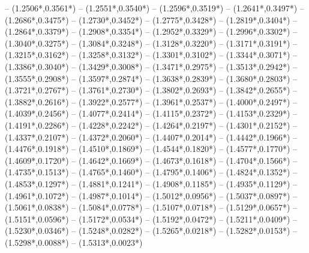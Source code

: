 {	-- ({1.2506*\dx},{0.3561*\dy})
	-- ({1.2551*\dx},{0.3540*\dy})
	-- ({1.2596*\dx},{0.3519*\dy})
	-- ({1.2641*\dx},{0.3497*\dy})
	-- ({1.2686*\dx},{0.3475*\dy})
	-- ({1.2730*\dx},{0.3452*\dy})
	-- ({1.2775*\dx},{0.3428*\dy})
	-- ({1.2819*\dx},{0.3404*\dy})
	-- ({1.2864*\dx},{0.3379*\dy})
	-- ({1.2908*\dx},{0.3354*\dy})
	-- ({1.2952*\dx},{0.3329*\dy})
	-- ({1.2996*\dx},{0.3302*\dy})
	-- ({1.3040*\dx},{0.3275*\dy})
	-- ({1.3084*\dx},{0.3248*\dy})
	-- ({1.3128*\dx},{0.3220*\dy})
	-- ({1.3171*\dx},{0.3191*\dy})
	-- ({1.3215*\dx},{0.3162*\dy})
	-- ({1.3258*\dx},{0.3132*\dy})
	-- ({1.3301*\dx},{0.3102*\dy})
	-- ({1.3344*\dx},{0.3071*\dy})
	-- ({1.3386*\dx},{0.3040*\dy})
	-- ({1.3429*\dx},{0.3008*\dy})
	-- ({1.3471*\dx},{0.2975*\dy})
	-- ({1.3513*\dx},{0.2942*\dy})
	-- ({1.3555*\dx},{0.2908*\dy})
	-- ({1.3597*\dx},{0.2874*\dy})
	-- ({1.3638*\dx},{0.2839*\dy})
	-- ({1.3680*\dx},{0.2803*\dy})
	-- ({1.3721*\dx},{0.2767*\dy})
	-- ({1.3761*\dx},{0.2730*\dy})
	-- ({1.3802*\dx},{0.2693*\dy})
	-- ({1.3842*\dx},{0.2655*\dy})
	-- ({1.3882*\dx},{0.2616*\dy})
	-- ({1.3922*\dx},{0.2577*\dy})
	-- ({1.3961*\dx},{0.2537*\dy})
	-- ({1.4000*\dx},{0.2497*\dy})
	-- ({1.4039*\dx},{0.2456*\dy})
	-- ({1.4077*\dx},{0.2414*\dy})
	-- ({1.4115*\dx},{0.2372*\dy})
	-- ({1.4153*\dx},{0.2329*\dy})
	-- ({1.4191*\dx},{0.2286*\dy})
	-- ({1.4228*\dx},{0.2242*\dy})
	-- ({1.4264*\dx},{0.2197*\dy})
	-- ({1.4301*\dx},{0.2152*\dy})
	-- ({1.4337*\dx},{0.2107*\dy})
	-- ({1.4372*\dx},{0.2060*\dy})
	-- ({1.4407*\dx},{0.2014*\dy})
	-- ({1.4442*\dx},{0.1966*\dy})
	-- ({1.4476*\dx},{0.1918*\dy})
	-- ({1.4510*\dx},{0.1869*\dy})
	-- ({1.4544*\dx},{0.1820*\dy})
	-- ({1.4577*\dx},{0.1770*\dy})
	-- ({1.4609*\dx},{0.1720*\dy})
	-- ({1.4642*\dx},{0.1669*\dy})
	-- ({1.4673*\dx},{0.1618*\dy})
	-- ({1.4704*\dx},{0.1566*\dy})
	-- ({1.4735*\dx},{0.1513*\dy})
	-- ({1.4765*\dx},{0.1460*\dy})
	-- ({1.4795*\dx},{0.1406*\dy})
	-- ({1.4824*\dx},{0.1352*\dy})
	-- ({1.4853*\dx},{0.1297*\dy})
	-- ({1.4881*\dx},{0.1241*\dy})
	-- ({1.4908*\dx},{0.1185*\dy})
	-- ({1.4935*\dx},{0.1129*\dy})
	-- ({1.4961*\dx},{0.1072*\dy})
	-- ({1.4987*\dx},{0.1014*\dy})
	-- ({1.5012*\dx},{0.0956*\dy})
	-- ({1.5037*\dx},{0.0897*\dy})
	-- ({1.5061*\dx},{0.0838*\dy})
	-- ({1.5084*\dx},{0.0778*\dy})
	-- ({1.5107*\dx},{0.0718*\dy})
	-- ({1.5129*\dx},{0.0657*\dy})
	-- ({1.5151*\dx},{0.0596*\dy})
	-- ({1.5172*\dx},{0.0534*\dy})
	-- ({1.5192*\dx},{0.0472*\dy})
	-- ({1.5211*\dx},{0.0409*\dy})
	-- ({1.5230*\dx},{0.0346*\dy})
	-- ({1.5248*\dx},{0.0282*\dy})
	-- ({1.5265*\dx},{0.0218*\dy})
	-- ({1.5282*\dx},{0.0153*\dy})
	-- ({1.5298*\dx},{0.0088*\dy})
	-- ({1.5313*\dx},{0.0023*\dy})
}
